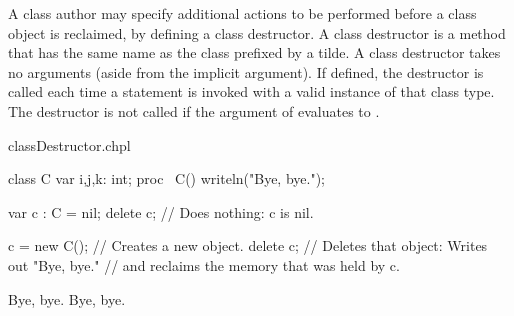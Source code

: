 A class author may specify additional actions to be performed before a class object is
reclaimed, by defining a class destructor.  A class destructor is a method that has the
same name as the class prefixed by a tilde.  A class destructor takes no arguments (aside from
the implicit  argument).  If defined, the destructor is called each time
a  statement is invoked with a valid instance of that class type.  The
destructor is not called if the argument of  evaluates to .

\begin{chapelexample}{classDestructor.chpl}
\begin{chapel}
class C {
  var i,j,k: int;
  proc ~C() { writeln("Bye, bye."); }
}

var c : C = nil;
delete c;        // Does nothing: c is nil.

c = new C();     // Creates a new object.
delete c;        // Deletes that object: Writes out "Bye, bye." 
                 // and reclaims the memory that was held by c.
\end{chapel}
\begin{chapeloutput}
Bye, bye.
Bye, bye.
\end{chapeloutput}
\end{chapelexample}
